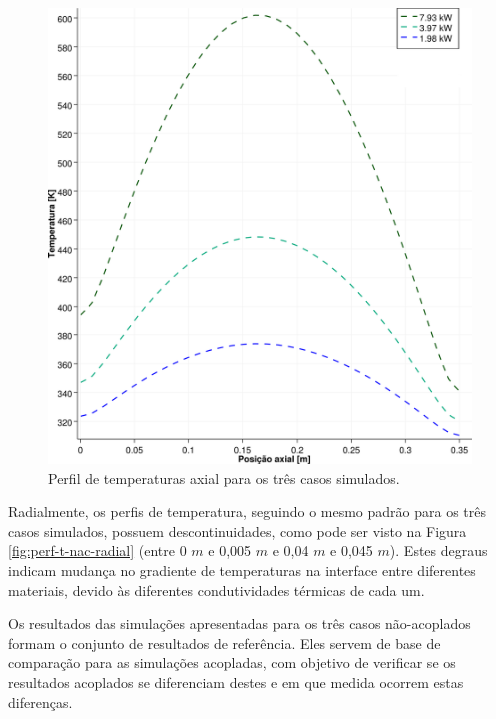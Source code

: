 \begin{figure}[htb]
  \caption{Perfil de temperaturas axial para os três casos simulados.}
  \centering\includegraphics[scale=0.5]{figuras/T_z_NC_square_port.png}
\end{figure}

Radialmente, os perfis de temperatura, seguindo o mesmo padrão para os três casos simulados,
possuem descontinuidades, como pode ser visto na Figura \ref{fig:perf-t-nac-radial} (entre
0 $m$ e 0,005 $m$ e 0,04 $m$ e 0,045 $m$). Estes degraus indicam mudança no gradiente de temperaturas na
interface entre diferentes materiais, devido às diferentes condutividades térmicas de cada um.

Os resultados das simulações apresentadas para os três casos não-acoplados formam o conjunto de resultados
de referência. Eles servem de base de comparação para as simulações acopladas, com objetivo de verificar
se os resultados acoplados se diferenciam destes e em que medida ocorrem estas diferenças.

